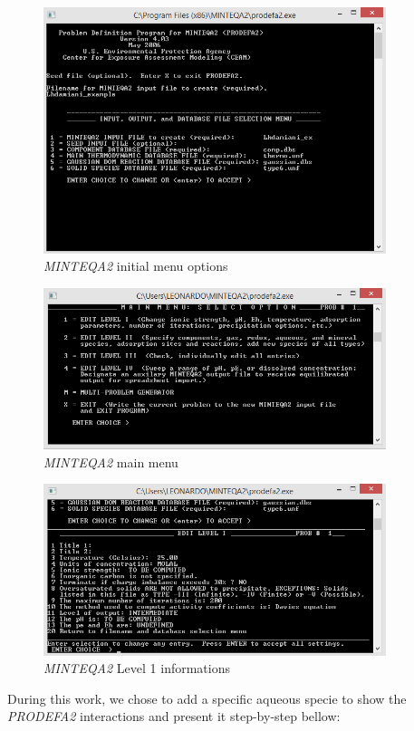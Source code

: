 \documentclass[ppgc,mestrado,english]{iiufrgs}
\begin{document}
\begin{figure}[ht!]
\centering
\includegraphics[width=100mm]{minteq-init.png}
\caption{\emph{MINTEQA2} initial menu options}
\label{minteq:init}
\end{figure}

\begin{figure}[ht!]
\centering
\includegraphics[width=100mm]{minteq-level0.png}
\caption{\emph{MINTEQA2} main menu}
\label{minteq:level0}
\end{figure}

\begin{figure}[ht!]
\centering
\includegraphics[width=100mm]{minteq-level1.png}
\caption{\emph{MINTEQA2} Level 1 informations}
\label{minteq:level1}
\end{figure}


During this work, we chose to add a specific aqueous specie to show the \emph{PRODEFA2} interactions and present it step-by-step bellow:
\end{document}
